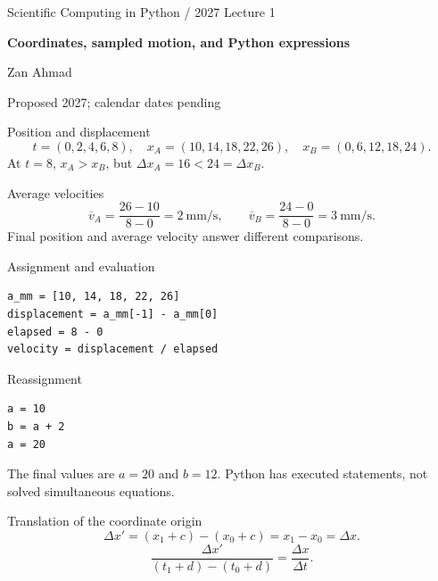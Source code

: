 \documentclass[aspectratio=169,11pt]{beamer}
\newcommand{\notestarget}{notes.pdf}\newcommand{\noteslabel}{Notes}
\begin{document}
\begin{frame}[plain]\vfill
{\small\color{accent} Scientific Computing in Python / 2027 \quad Lecture 1}\par\medskip
{\raggedright{}\LARGE\bfseries\color{ink} Coordinates, sampled motion, and Python expressions}\par\bigskip
Zan Ahmad\par\smallskip
{\small Proposed 2027; calendar dates pending}\par\vfill\end{frame}
\renewcommand{\notestarget}{notes.pdf\#note-position-and-displacement}
\begin{frame}[t,fragile,label=slide-position-and-displacement]{Position and displacement}
\[
t=(0,2,4,6,8),\quad x_A=(10,14,18,22,26),\quad x_B=(0,6,12,18,24).
\]
\pause{}
At $t=8$, $x_A>x_B$, but $\Delta x_A=16<24=\Delta x_B$.
\end{frame}
\renewcommand{\notestarget}{notes.pdf\#note-position-and-displacement}
\begin{frame}[t,fragile,label=slide-average-velocities]{Average velocities}
\[
\overline v_A=\frac{26-10}{8-0}=2\ \mathrm{mm/s},\qquad
\overline v_B=\frac{24-0}{8-0}=3\ \mathrm{mm/s}.
\]
\pause{}
Final position and average velocity answer different comparisons.
\end{frame}
\renewcommand{\notestarget}{notes.pdf\#note-assignment-and-evaluation}
\begin{frame}[t,fragile,label=slide-assignment-and-evaluation]{Assignment and evaluation}
\begin{verbatim}
a_mm = [10, 14, 18, 22, 26]
displacement = a_mm[-1] - a_mm[0]
elapsed = 8 - 0
velocity = displacement / elapsed
\end{verbatim}
\end{frame}
\renewcommand{\notestarget}{notes.pdf\#note-assignment-and-evaluation}
\begin{frame}[t,fragile,label=slide-reassignment]{Reassignment}
\begin{verbatim}
a = 10
b = a + 2
a = 20
\end{verbatim}
\pause{}
The final values are $a=20$ and $b=12$. Python has executed statements, not solved simultaneous equations.
\end{frame}
\renewcommand{\notestarget}{notes.pdf\#note-translation-of-the-coordinate-origin}
\begin{frame}[t,fragile,label=slide-translation-of-the-coordinate-origin]{Translation of the coordinate origin}
\[
\Delta x'=(x_1+c)-(x_0+c)=x_1-x_0=\Delta x.
\]
\pause{}
\[
\frac{\Delta x'}{(t_1+d)-(t_0+d)}=\frac{\Delta x}{\Delta t}.
\]
\end{frame}
\end{document}
